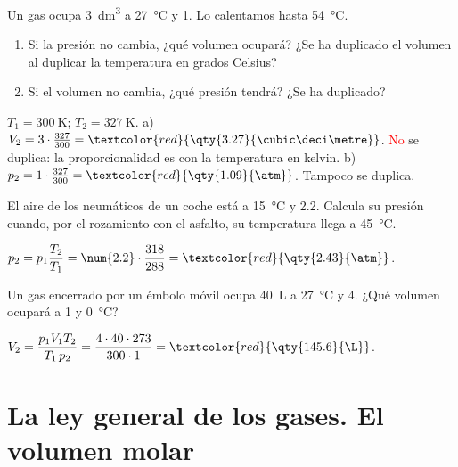 \begin{exercise}
    Un gas ocupa \qty{3}{\cubic\deci\metre} a \qty{27}{\celsius} y \qty{1}{\atm}. Lo calentamos hasta \qty{54}{\celsius}.
    \begin{enumerate}[label=\alph*)]
        \item Si la presión no cambia, ¿qué volumen ocupará? ¿Se ha duplicado el volumen al duplicar la temperatura en grados Celsius?
        \item Si el volumen no cambia, ¿qué presión tendrá? ¿Se ha duplicado?
    \end{enumerate}
    \begin{solu}
        \(T_1 = \qty{300}{\kelvin}\); \(T_2 = \qty{327}{\kelvin}\).
        a) \(V_2 = 3 \cdot \frac{327}{300} = \textcolor{red}{\qty{3.27}{\cubic\deci\metre}}\). \textcolor{red}{No} se duplica: la proporcionalidad es con la temperatura en kelvin.
        b) \(p_2 = 1 \cdot \frac{327}{300} = \textcolor{red}{\qty{1.09}{\atm}}\). Tampoco se duplica.
    \end{solu}
\end{exercise}

\begin{exercise}
    El aire de los neumáticos de un coche está a \qty{15}{\celsius} y \qty{2.2}{\atm}. Calcula su presión cuando, por el rozamiento con el asfalto, su temperatura llega a \qty{45}{\celsius}.
    \begin{solu}
        \(p_2 = p_1 \dfrac{T_2}{T_1} = \num{2.2} \cdot \dfrac{318}{288} = \textcolor{red}{\qty{2.43}{\atm}}\).
    \end{solu}
\end{exercise}

\begin{exercise}
    Un gas encerrado por un émbolo móvil ocupa \qty{40}{\L} a \qty{27}{\celsius} y \qty{4}{\atm}. ¿Qué volumen ocupará a \qty{1}{\atm} y \qty{0}{\celsius}?
    \begin{solu}
        \(V_2 = \dfrac{p_1 V_1 T_2}{T_1 \, p_2} = \dfrac{4 \cdot 40 \cdot 273}{300 \cdot 1} = \textcolor{red}{\qty{145.6}{\L}}\).
    \end{solu}
\end{exercise}

\section{La ley general de los gases. El volumen molar}

